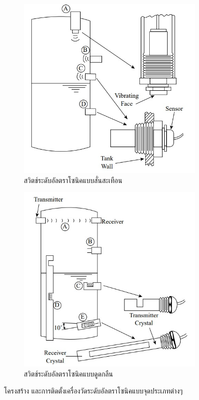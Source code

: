 \documentclass[final,11pt,a4paper]{article}
\begin{document}
\begin{figure}[h]
    \begin{subfigure}[b]{0.5\textwidth}
        \centering
        \includegraphics[width=\textwidth]{images/Screenshot_16.jpg}
        \caption{สวิตช์ระดับอัลตราโซนิคแบบสั่นสะเทือน}
        \label{fig:uld1}
    \end{subfigure}
    \hfill
    \begin{subfigure}[b]{0.5\textwidth}
        \centering
        \includegraphics[width=\textwidth]{images/Screenshot_17.jpg}
        \caption{สวิตช์ระดับอัลตราโซนิคแบบดูดกลืน}
        \label{fig:uld2}
    \end{subfigure}
    \hfill
    \caption{โครงสร้าง และการติดตั้งเครื่องวัดระดับอัลตราโซนิคแบบจุดประเภทต่างๆ}
    \label{fig:uld}
\end{figure}
\end{document}
